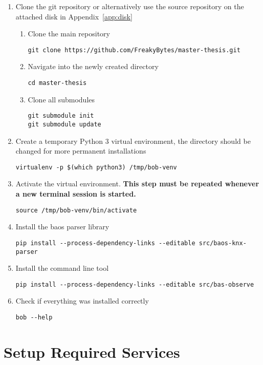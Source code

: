 \begin{enumerate}
	\item Clone the git repository or alternatively use the source repository on the attached disk in Appendix~\ref{app:disk}
		\begin{enumerate}
			\item Clone the main repository
\begin{lstlisting}
git clone https://github.com/FreakyBytes/master-thesis.git
\end{lstlisting}
			\item Navigate into the newly created directory
\begin{lstlisting}
cd master-thesis
\end{lstlisting}			
			\item Clone all submodules
\begin{lstlisting}
git submodule init
git submodule update
\end{lstlisting}
		\end{enumerate}
	\item Create a temporary Python 3 virtual environment, the directory should be changed for more permanent installations
\begin{lstlisting}
virtualenv -p $(which python3) /tmp/bob-venv
\end{lstlisting}
	\item Activate the virtual environment. \textbf{This step must be repeated whenever a new terminal session is started.}
\begin{lstlisting}
source /tmp/bob-venv/bin/activate
\end{lstlisting}
	\item Install the \gls{baos} parser library
\begin{lstlisting}
pip install --process-dependency-links --editable src/baos-knx-parser
\end{lstlisting}
	\item Install the  command line tool
\begin{lstlisting}
pip install --process-dependency-links --editable src/bas-observe
\end{lstlisting}
	\item Check if everything was installed correctly
\begin{lstlisting}
bob --help
\end{lstlisting}
\end{enumerate}

\section{Setup Required Services}
\label{app:reproduce:services}

